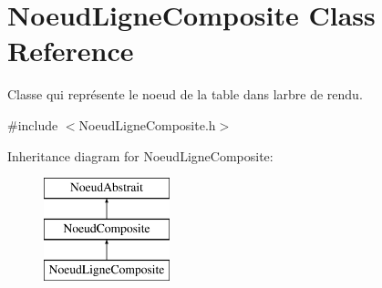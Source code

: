 \hypertarget{class_noeud_ligne_composite}{}\section{Noeud\+Ligne\+Composite Class Reference}
\label{class_noeud_ligne_composite}


Classe qui représente le noeud de la table dans l\textquotesingle{}arbre de rendu.  




{\ttfamily \#include $<$Noeud\+Ligne\+Composite.\+h$>$}

Inheritance diagram for Noeud\+Ligne\+Composite\+:\begin{figure}[H]
\begin{center}
\leavevmode
\includegraphics[height=3.000000cm]{class_noeud_ligne_composite}
\end{center}
\end{figure}

